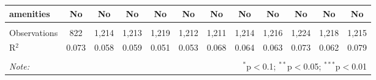 \begin{table}[!htbp]
\begin{tabular}{@{\extracolsep{5pt}}lccccccccccc}
amenities & No & No & No & No & No & No & No & No & No & No & No \\ 
\hline \\[-1.8ex] 
Observations & 822 & 1,214 & 1,213 & 1,219 & 1,212 & 1,211 & 1,214 & 1,216 & 1,224 & 1,218 & 1,215 \\ 
R$^{2}$ & 0.073 & 0.058 & 0.059 & 0.051 & 0.053 & 0.068 & 0.064 & 0.063 & 0.073 & 0.062 & 0.079 \\ 
\hline 
\hline \\[-1.8ex] 
\textit{Note:}  & \multicolumn{11}{r}{$^{*}$p$<$0.1; $^{**}$p$<$0.05; $^{***}$p$<$0.01} \\ 
\end{tabular} 
\end{table} 
